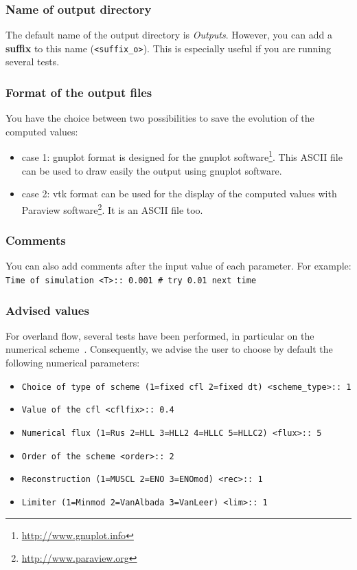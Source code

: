 \documentclass[a4paper, 11pt]{article}
\begin{document}
\subsubsection{Name of output directory}

The default name of the output directory is \textit{Outputs}. However, you can add a \textbf{suffix} to this name (\texttt{<suffix\_o>}). This is especially useful if you are running several tests.

\subsubsection{Format of the output files}
You have the choice between two possibilities to save the evolution of the computed values:
\begin{itemize}
\item case 1: gnuplot format is designed for the gnuplot software\footnote{\url{http://www.gnuplot.info}}. This ASCII file can be used to draw easily the output using gnuplot software.
\item case 2: vtk format can be used for the display of the computed values with Paraview software\footnote{\url{http://www.paraview.org}}. It is an ASCII file too.
\end{itemize}

\subsubsection{Comments}
You can also add comments after the input value of each parameter. For  example:\\
\verb!Time of simulation <T>:: 0.001 # try 0.01 next time!

\subsubsection{Advised values}\label{rem:default}
For overland flow, several tests have been performed, in particular on the numerical scheme~\cite{Delestre10b}. 
Consequently, we advise the user to choose by default the following numerical parameters:
\begin{itemize}
\item \texttt{Choice of type of scheme (1=fixed cfl  2=fixed dt) <scheme\_type>:: 1}
\item \texttt{Value of the cfl  <cflfix>:: 0.4}
\item \texttt{Numerical flux (1=Rus 2=HLL 3=HLL2 4=HLLC 5=HLLC2) <flux>:: 5}
\item \texttt{Order of the scheme <order>:: 2}
\item \texttt{Reconstruction (1=MUSCL 2=ENO 3=ENOmod) <rec>:: 1}
\item \texttt{Limiter (1=Minmod 2=VanAlbada 3=VanLeer) <lim>:: 1}
\end{itemize}
\end{document}

